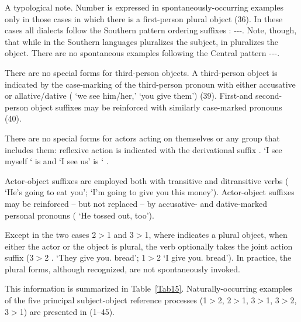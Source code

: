 A typological note. Number is expressed in spontaneously-occurring examples only in those cases in which there is a first-person plural object (36). In these cases all \SYQ{} dialects follow the Southern \QII{} pattern ordering suffixes : ---. Note, though, that while in the Southern \QII{} languages  pluralizes the subject, in \SYQ{}  pluralizes the object. There are no spontaneous examples following the Central \QII{} pattern ---.

There are no special forms for third-person objects. A third-person object is indicated by the case-marking of the third-person pronoun  with either accusative  or allative/dative  (  `we see him/her,'   `you give them') (39). First-and second-person object suffixes may be reinforced with similarly case-marked pronouns (40).

There are no special forms for actors acting on themselves or any group that includes them: reflexive action is indicated with the derivational suffix . `I see myself ` is   and `I see us' is `  .

Actor-object suffixes are employed both with transitive and ditransitive verbs ( `He's going to eat you';  `I'm going to give you this money'). Actor-object suffixes may be reinforced -- but not replaced -- by accusative- and dative-marked personal pronouns (  `He tossed  out, too').

Except in the two cases 2$>$1 and 3$>$1, where  indicates a plural object, when either the actor or the object is plural, the verb optionally takes the joint action suffix  (3$>$2    . `They give you. bread'; 1$>$2    `I give you. bread'). In practice, the plural forms, although recognized, are not spontaneously invoked.

This information is summarized in Table~\ref{Tab15}. Naturally-occurring examples of the five principal subject-object reference processes (1$>$2, 2$>$1, 3$>$1, 3$>$2, 3$>$1) are presented in (1--45).


